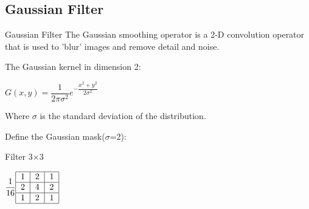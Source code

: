 \documentclass{beamer}
\begin{document}
\subsection{Gaussian Filter}
\begin{frame}{Gaussian Filter}
The Gaussian smoothing operator is a 2-D convolution operator that is used to 'blur' images and remove detail and noise.
\vspace{0.8cm}

The Gaussian kernel in dimension 2:




\hspace{3cm}$G(x,y)=\dfrac{1}{2\pi\sigma^2}e^{-{\dfrac{x^2+y^2}{2\sigma^2}}}$\vspace{0.2cm}	

Where $\sigma$ is the standard deviation of the distribution.
\vspace{0.8cm}

Define the Gaussian mask($\sigma$=2):
\begin{center}
	Filter 3$\times$3
	
	$\dfrac{1}{16}\begin{tabular}{|c|c|c|}
	\hline 
	1 & 2 & 1 \\ 
	\hline 
	2 & 4 & 2 \\ 
	\hline 
	1 & 2 & 1 \\ 
	\hline 
	\end{tabular} $
\end{center}
\end{frame}
\end{document}
